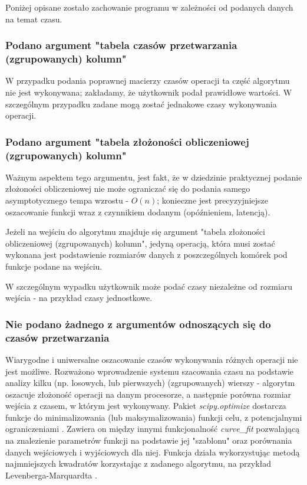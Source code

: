 \documentclass[brudnopis]{xmgr}
\begin{document}
Poniżej opisane zostało zachowanie programu w zależności od podanych danych na temat czasu.

\subsubsection{Podano argument "tabela czasów przetwarzania (zgrupowanych) kolumn"}

W przypadku podania poprawnej macierzy czasów operacji ta część algorytmu nie jest wykonywana; zakładamy, że użytkownik podał prawidłowe wartości.
W szczególnym przypadku zadane mogą zostać jednakowe czasy wykonywania operacji.

\subsubsection{Podano argument "tabela złożoności obliczeniowej (zgrupowanych) kolumn"}

Ważnym aspektem tego argumentu, jest fakt, że w dziedzinie praktycznej podanie złożoności obliczeniowej nie może ograniczać się do podania samego asymptotycznego tempa wzrostu - $O(n)$; konieczne jest precyzyjniejsze oszacowanie funkcji wraz z czynnikiem dodanym (opóźnieniem, latencją).
\medskip

Jeżeli na wejściu do algorytmu znajduje się argument "tabela złożoności obliczeniowej (zgrupowanych) kolumn", jedyną operacją, która musi zostać wykonana jest podstawienie rozmiarów danych z poszczególnych komórek pod funkcje podane na wejściu.
\medskip

W szczególnym wypadku użytkownik może podać czasy niezależne od rozmiaru wejścia - na przykład czasy jednostkowe.
\medskip

\subsubsection{Nie podano żadnego z argumentów odnoszących się do czasów przetwarzania}

Wiarygodne i uniwersalne oszacowanie czasów wykonywania różnych operacji nie jest możliwe.
Rozważono wprowadzenie systemu szacowania czasu na podstawie analizy kilku (np. losowych, lub pierwszych) (zgrupowanych) wierszy - algorytm oszacuje złożoność operacji na danym procesorze, a następnie porówna rozmiar wejścia z czasem, w którym jest wykonywany.
Pakiet \emph{scipy.optimize} dostarcza funkcje do minimalizowania (lub maksymalizowania) funkcji celu, z potencjalnymi ograniczeniami \cite{scipyoptimize}. Zawiera on między innymi funkcjonalność \emph{curve\_fit} pozwalającą na znalezienie parametrów funkcji na podstawie jej "szablonu" oraz porównania danych wejściowych i wyjściowych dla niej.
Funkcja działa wykorzystując metodą najmniejszych kwadratów korzystając z zadanego algorytmu, na przykład Levenberga-Marquardta \cite{lourakis2005brief}.
\end{document}
